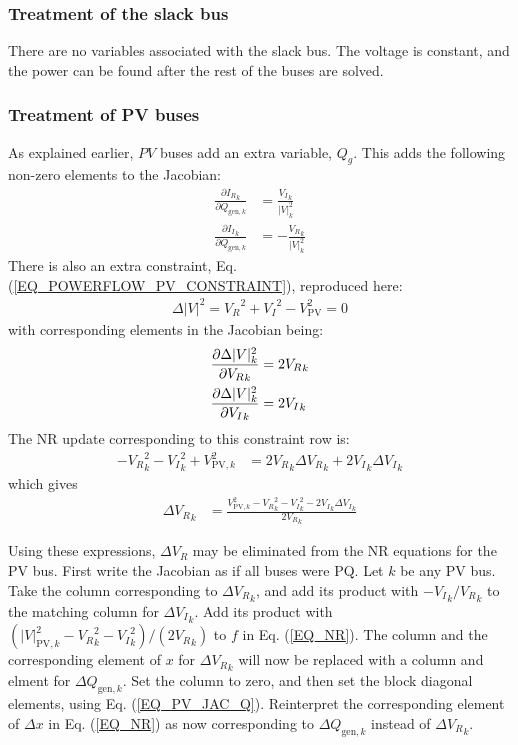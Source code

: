 \documentclass[11pt]{article}
\newcommand{\Vr}{{V_R}}
\newcommand{\Vi}{{V_I}}
\newcommand{\Ir}{{I_R}}
\newcommand{\Ii}{{I_I}}
\begin{document}
\subsubsection{Treatment of the slack bus}
There are no variables associated with the slack bus. The voltage is constant, and the power can be found after the rest of the buses are solved.

\subsubsection{Treatment of PV buses}
As explained earlier, $PV$ buses add an extra variable, $Q_g$. This adds the following non-zero elements to the Jacobian:
\begin{align}
\frac{\partial \Ir_k}{\partial Q_{\text{gen},k}} &= \frac{\Vi_k}{|V|_k^2} \\
\frac{\partial \Ii_k}{\partial Q_{\text{gen},k}} &= -\frac{\Vr_k}{|V|_k^2}
\end{align}
There is also an extra constraint, Eq. (\ref{EQ_POWERFLOW_PV_CONSTRAINT}), reproduced here:
\begin{align}
\Delta |V|^2 = \Vr^2 + \Vi^2 - V_\text{PV}^2 = 0
\label{EQ_POWERFLOW_PV_CONSTRAINT_AGAIN}
\end{align}
with corresponding elements in the Jacobian being:
\begin{align}
\frac{\partial \Delta|V|^2_k}{\partial \Vr_k} &= 2 \Vr_k \notag \\
\frac{\partial \Delta|V|^2_k}{\partial \Vi_k} &= 2 \Vi_k
\label{EQ_PV_JAC_Q}
\end{align}
The NR update corresponding to this constraint row is:
\begin{align}
	-\Vr_k^2 - \Vi_k^2 + V_{\text{PV},k}^2 &= 2\Vr_k\Delta\Vr_k + 2\Vi_k\Delta\Vi_k
\end{align}
which gives
\begin{align}
\Delta \Vr_k &= \frac{V^2_{\text{PV},k} - \Vr_k^2 - \Vi_k^2- 2\Vi_k\Delta \Vi_k}{2\Vr_k}
\end{align}

Using these expressions, $\Delta \Vr$ may be eliminated from the NR equations for the PV bus. First write the Jacobian as if all buses were PQ. Let $k$ be any PV bus. Take the column corresponding to $\Delta \Vr_k$, and add its product with $-\Vi_k/\Vr_k$ to the matching column for  $\Delta \Vi_k$. Add its product with $(|V|^2_{\text{PV},k} - \Vr_k^2 - \Vi_k^2)/(2\Vr_k)$ to $f$ in Eq. (\ref{EQ_NR}). The column and the corresponding element of $x$ for $\Delta \Vr_k$ will now be replaced with a column and elment for $\Delta Q_{\text{gen},k}$. Set the column to zero, and then set the block diagonal elements, using Eq. (\ref{EQ_PV_JAC_Q}). Reinterpret the corresponding element of $\Delta x$ in Eq. (\ref{EQ_NR}) as now corresponding to $\Delta Q_{\text{gen},k}$ instead of $\Delta \Vr_k$.
\end{document}
